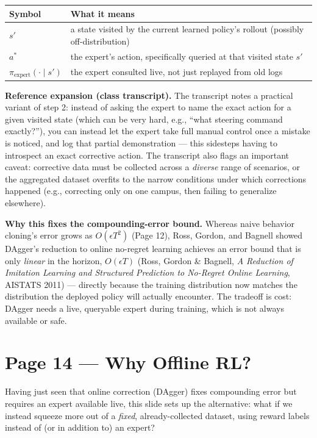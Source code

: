 \documentclass[11pt]{article}
\begin{document}
\begin{center}
\begin{tabular}{@{}ll@{}}
\toprule
Symbol & What it means \\
\midrule
$s'$ & a state visited by the current learned policy's rollout (possibly off-distribution) \\
$a^*$ & the expert's action, specifically queried at that visited state $s'$ \\
$\pi_{\text{expert}}(\cdot\mid s')$ & the expert consulted live, not just replayed from old logs \\
\bottomrule
\end{tabular}
\end{center}

\textbf{Reference expansion (class transcript).} The transcript notes a practical variant of step 2: instead of asking the expert to name the exact action for a given visited state (which can be very hard, e.g., ``what steering command exactly?''), you can instead let the expert take full manual control once a mistake is noticed, and log that partial demonstration --- this sidesteps having to introspect an exact corrective action. The transcript also flags an important caveat: corrective data must be collected across a \emph{diverse} range of scenarios, or the aggregated dataset overfits to the narrow conditions under which corrections happened (e.g., correcting only on one campus, then failing to generalize elsewhere).

\textbf{Why this fixes the compounding-error bound.} Whereas naive behavior cloning's error grows as $O(\epsilon T^2)$ (Page 12), Ross, Gordon, and Bagnell showed DAgger's reduction to online no-regret learning achieves an error bound that is only \emph{linear} in the horizon, $O(\epsilon T)$ (Ross, Gordon \& Bagnell, \emph{A Reduction of Imitation Learning and Structured Prediction to No-Regret Online Learning}, AISTATS 2011) --- directly because the training distribution now matches the distribution the deployed policy will actually encounter. The tradeoff is cost: DAgger needs a live, queryable expert during training, which is not always available or safe.

\section*{Page 14 --- Why Offline RL?}

Having just seen that online correction (DAgger) fixes compounding error but requires an expert available live, this slide sets up the alternative: what if we instead squeeze more out of a \emph{fixed}, already-collected dataset, using reward labels instead of (or in addition to) an expert?
\end{document}
